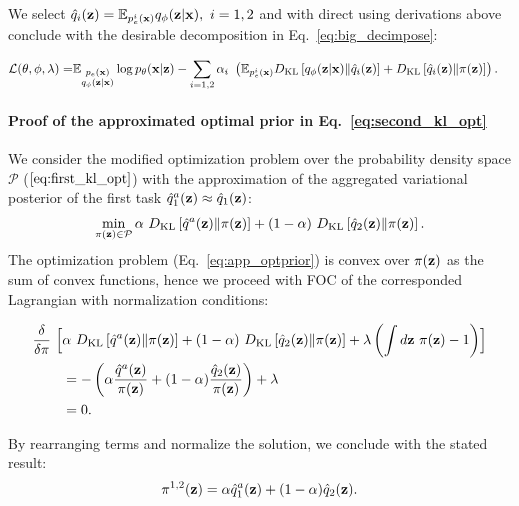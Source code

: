 We select $\hat{q}_{i}({\mathbf{z}}) = \mathbb{E}_{p^{i}_{e}({\mathbf{x}})}q_{\phi}({\mathbf{z}}|{\mathbf{x}}),~i=1,2$ and with direct using derivations above conclude with the desirable decomposition in Eq.~\ref{eq:big_decimpose}:
\begin{fullwidth}
\begin{equation}
    \begin{aligned}
     \mathcal{L}(\theta, \phi, \lambda) = & \mathbb{E}_{\substack{p_{e}({\mathbf{x}})\\q_{\phi}({\mathbf{z}}|{\mathbf{x}})}}\log p_{\theta}({\mathbf{x}}|{\mathbf{z}})  - \sum\limits_{i=1,2}\alpha_i~\left( \mathbb{E}_{p^i_{e}({\mathbf{x}})}D_{\mathrm{KL}}\left[q_{\phi}({\mathbf{z}}|{\mathbf{x}})\|\hat{q}_{i}({\mathbf{z}})\right]+ D_{\mathrm{KL}}\left[\hat{q}_{i}({\mathbf{z}})\|\pi({\mathbf{z}})\right]\right).
    \end{aligned}
\end{equation}
\end{fullwidth}
\paragraph{Proof of the approximated optimal prior in Eq.~\ref{eq:second_kl_opt}}
We consider the modified optimization problem over the probability density space $\mathcal{P}$ ($\ref{eq:first_kl_opt}$) with the approximation of the aggregated variational posterior of the first task
$\hat{q}_{1}^{a}({\mathbf{z}})\approx\hat{q}_{1}({\mathbf{z}})$:
\begin{equation}
\label{eq:app_optprior}
    \begin{aligned}
    \min\limits_{\pi(\rvz)\in\mathcal{P}}\alpha~\KL{\hat{q}^{a}(\rvz)}{\pi(\rvz)}  + (1-\alpha)~\KL{\hat{q}_{2}(\rvz)}{\pi(\rvz)}.
    \end{aligned}
\end{equation}
The optimization problem (Eq.~\ref{eq:app_optprior}) is convex over $\pi({\mathbf{z}})$ as the sum of convex functions, hence we proceed with FOC of the corresponded Lagrangian with normalization conditions:
\begin{fullwidth}
\begin{equation}
    \begin{aligned}
     \frac{\delta}{\delta\pi} ~\Bigl[&\alpha~D_{\mathrm{KL}}\left[\hat{q}^{a}({\mathbf{z}})\|\pi({\mathbf{z}})\right] + (1-\alpha)~D_{\mathrm{KL}}\left[\hat{q}_{2}({\mathbf{z}})\|\pi({\mathbf{z}})\right]  + \lambda \left(\int d{\mathbf{z}}~\pi({\mathbf{z}}) - 1 \right)\Bigr]  \\
     &= - \left(\alpha \frac{\hat{q}^{a}({\mathbf{z}})}{\pi({\mathbf{z}})} + (1-\alpha)\frac{\hat{q}_{2}({\mathbf{z}})}{\pi({\mathbf{z}})}\right) + \lambda \\
     &= 0.
    \end{aligned}
\end{equation}
\end{fullwidth}
By rearranging terms and normalize the solution, we conclude with the stated result:
\begin{equation}
    \begin{aligned}
    \pi^{1,2}({\mathbf{z}}) = \alpha \hat{q}_{1}^{a}({\mathbf{z}}) + (1-\alpha) \hat{q}_{2}({\mathbf{z}}).
    \end{aligned}
\end{equation}
